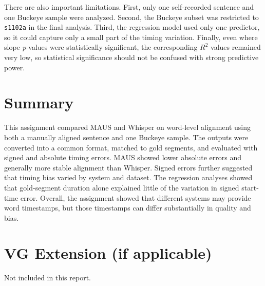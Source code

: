 \documentclass[11pt]{article}
\begin{document}
There are also important limitations. First, only one self-recorded sentence and one Buckeye sample were analyzed. Second, the Buckeye subset was restricted to \texttt{s1102a} in the final analysis. Third, the regression model used only one predictor, so it could capture only a small part of the timing variation. Finally, even where slope \textit{p}-values were statistically significant, the corresponding $R^2$ values remained very low, so statistical significance should not be confused with strong predictive power.

\section{Summary}
This assignment compared MAUS and Whisper on word-level alignment using both a manually aligned sentence and one Buckeye sample. The outputs were converted into a common format, matched to gold segments, and evaluated with signed and absolute timing errors. MAUS showed lower absolute errors and generally more stable alignment than Whisper. Signed errors further suggested that timing bias varied by system and dataset. The regression analyses showed that gold-segment duration alone explained little of the variation in signed start-time error. Overall, the assignment showed that different systems may provide word timestamps, but those timestamps can differ substantially in quality and bias.

\section*{VG Extension (if applicable)}
Not included in this report.



\end{document}
